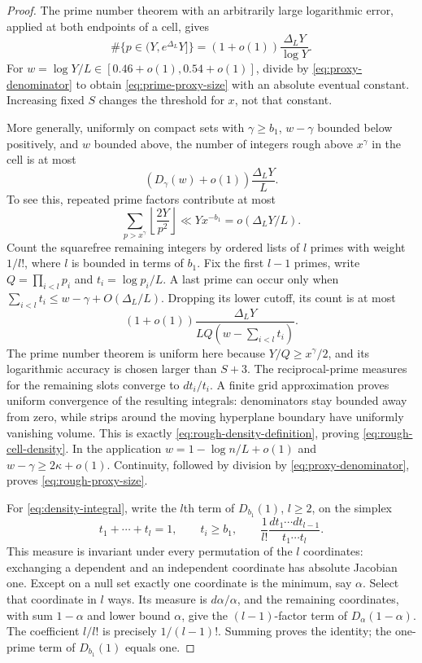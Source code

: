 \begin{proof}
The prime number theorem with an arbitrarily large logarithmic
error, applied at both endpoints of a cell, gives
\[
 \#\{p\in(Y,e^{\Delta_L}Y]\}
   =(1+o(1))\frac{\Delta_LY}{\log Y}.
\]
For $w=\log Y/L\in[0.46+o(1),0.54+o(1)]$, divide by
\eqref{eq:proxy-denominator} to obtain
\eqref{eq:prime-proxy-size} with an absolute eventual constant.
Increasing fixed $S$ changes the threshold for $x$, not that
constant.

More generally, uniformly on compact sets with $\gamma\ge b_1$,
$w-\gamma$ bounded below positively, and $w$ bounded above, the
number of integers rough above $x^\gamma$ in the cell is at most
\begin{equation}\label{eq:rough-cell-density}
 (D_\gamma(w)+o(1))\frac{\Delta_LY}{L}.
\end{equation}
To see this, repeated prime factors contribute at most
\[
 \sum_{p>x^\gamma}\left\lfloor\frac{2Y}{p^2}\right\rfloor
 \ll Yx^{-b_1}=o(\Delta_LY/L).
\]
Count the squarefree remaining integers by ordered lists of $l$
primes with weight $1/l!$, where $l$ is bounded in terms of
$b_1$. Fix the first $l-1$ primes, write $Q=\prod_{i<l}p_i$ and
$t_i=\log p_i/L$. A last prime can occur only when
$\sum_{i<l}t_i\le w-\gamma+O(\Delta_L/L)$. Dropping its lower
cutoff, its count is at most
\[
 (1+o(1))\frac{\Delta_LY}{LQ(w-\sum_{i<l}t_i)}.
\]
The prime number theorem is uniform here because
$Y/Q\ge x^\gamma/2$, and its logarithmic accuracy is chosen
larger than $S+3$. The reciprocal-prime measures for the remaining
slots converge to $dt_i/t_i$. A finite grid approximation proves
uniform convergence of the resulting integrals: denominators
stay bounded away from zero, while strips around the moving
hyperplane boundary have uniformly vanishing volume. This is
exactly \eqref{eq:rough-density-definition}, proving
\eqref{eq:rough-cell-density}. In the application
$w=1-\log n/L+o(1)$ and $w-\gamma\ge2\kappa+o(1)$.
Continuity, followed by division by
\eqref{eq:proxy-denominator}, proves \eqref{eq:rough-proxy-size}.

For \eqref{eq:density-integral}, write the $l$th term of
$D_{b_1}(1)$, $l\ge2$, on the simplex
\[
 t_1+\cdots+t_l=1,\qquad t_i\ge b_1,
 \qquad \frac1{l!}\frac{dt_1\cdots dt_{l-1}}{t_1\cdots t_l}.
\]
This measure is invariant under every permutation of the $l$
coordinates: exchanging a dependent and an independent coordinate
has absolute Jacobian one. Except on a null set exactly one
coordinate is the minimum, say $\alpha$. Select that coordinate
in $l$ ways. Its measure is $d\alpha/\alpha$, and the remaining
coordinates, with sum $1-\alpha$ and lower bound $\alpha$, give
the $(l-1)$-factor term of $D_\alpha(1-\alpha)$. The coefficient
$l/l!$ is precisely $1/(l-1)!$. Summing proves the identity; the
one-prime term of $D_{b_1}(1)$ equals one.


\end{proof}
